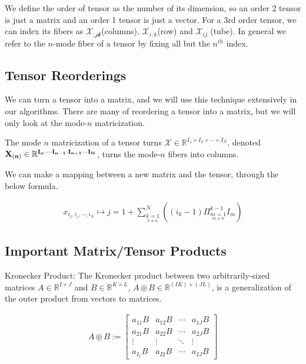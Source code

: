 \documentclass[11pt]{article}
\newcommand\0{\mathbf{0}}
\newcommand\RR{\mathbb{R}}
\newcommand\cc{\circledcirc}
\newcommand\<{\langle}
\renewcommand\>{\rangle}
\begin{document}
We define the order of tensor as the number of its dimension, so an order 2 tensor is just a matrix and an order 1 tensor is just a vector. For a 3rd order tensor, we can index its fibers as $\mathcal{X_{\text{:jk}}}$(columns), $\mathcal{X}_{i:k}$(row) and $\mathcal{X}_{ij:}$(tube). In general we refer to the $n$-mode fiber of a tensor by fixing all but the $n^{th}$ index.

\subsection{Tensor Reorderings}

We can turn a tensor into a matrix, and we will use this technique extensively in our algorithms.
There are many of reordering a tensor into a matrix, but we will only look at the mode-$n$ matricization.

The mode $n$ matricization of a tensor turns $\mathcal{X}\in \RR^{I_1\times I_2 \times \cdots \times I_{N}}$, denoted $\bf{X}_{(n)}\in \RR^{I_{n} \cdot \cdots I_{n-1} \cdot I_{n+1} \cdots I_{N}}$, turns the mode-$n$ fibers into columns.

We can make a mapping between a new matrix and the tensor, through the below formula.

\begin{align*}
    x_{i_{1},i_{_2},\cdots ,i_N} \mapsto j= 1+ \sum_{\underset{k\neq n}{k=1}}^{N}((i_{k}-1)\Pi_{\underset{m\neq n}{m=1}}^{k-1}I_m)
\end{align*}

\subsection{Important Matrix/Tensor Products}

Kronecker Product: The Kronecker product between two arbitrarily-sized matrices $A\in \RR^{I\times J}$ and $B \in \RR^{K\times L}$, $A \cc B \in \RR^{(IK)\times (JL)}$, is a generalization of the outer product from vectors to matrices.

\begin{align}
    A\cc B := 
    \begin{bmatrix}
        a_{11}B & a_{12}B& \cdots & a_{1J}B\\
        a_{21}B & a_{22}B& \cdots & a_{2J}B\\
        \vdots & \vdots & \ddots & \vdots \\
        a_{I_{1}}B & a_{I2}B & \cdots & a_{IJ}B
    \end{bmatrix}
\end{align}
\end{document}
